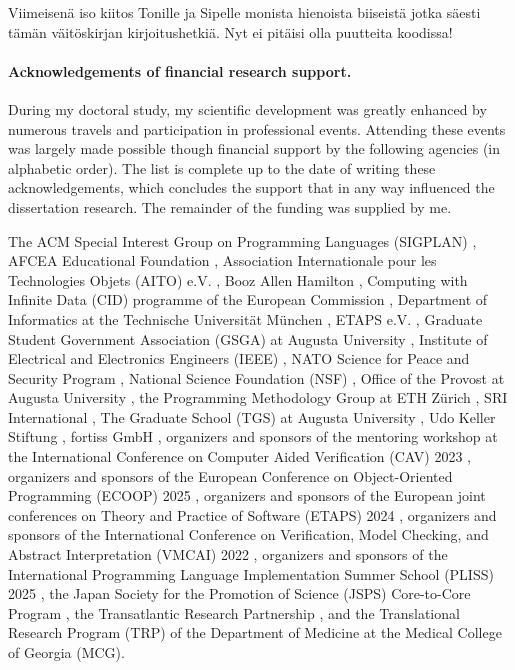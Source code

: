 Viimeisenä iso kiitos Tonille ja Sipelle monista hienoista biiseistä jotka säesti tämän väitöskirjan kirjoitushetkiä.
Nyt ei pitäisi olla puutteita koodissa!

\paragraph*{Acknowledgements of financial research support.}
During my doctoral study, my scientific development was greatly enhanced by numerous travels and participation in professional events.
Attending these events was largely made possible though financial support by the following agencies (in alphabetic order).
The list is complete up to the date of writing these acknowledgements, which concludes the support that in any way influenced the dissertation research.
The remainder of the funding was supplied by me.

The ACM Special Interest Group on Programming Languages (SIGPLAN)%
, AFCEA Educational Foundation%
, Association Internationale pour les Technologies Objets (AITO) e.V.%
, Booz Allen Hamilton%
, Computing with Infinite Data (CID) programme of the European Commission%
, Department of Informatics at the Technische Universität München%
, ETAPS e.V.%
, Graduate Student Government Association (GSGA) at Augusta University%
, Institute of Electrical and Electronics Engineers (IEEE)%
, NATO Science for Peace and Security Program%
, National Science Foundation (NSF)%
, Office of the Provost at Augusta University%
, the Programming Methodology Group at ETH Zürich%
, SRI International%
, The Graduate School (TGS) at Augusta University%
, Udo Keller Stiftung%
, fortiss GmbH%
, organizers and sponsors of the mentoring workshop at the International Conference on Computer Aided Verification (CAV) 2023%
, organizers and sponsors of the European Conference on Object-Oriented Programming (ECOOP) 2025%
, organizers and sponsors of the European joint conferences on Theory and Practice of Software (ETAPS) 2024%
, organizers and sponsors of the International Conference on Verification, Model Checking, and Abstract Interpretation (VMCAI) 2022%
, organizers and sponsors of the International Programming Language Implementation Summer School (PLISS) 2025%
, the Japan Society for the Promotion of Science (JSPS) Core-to-Core Program%
, the Transatlantic Research Partnership%
, and the Translational Research Program (TRP) of the Department of Medicine at the Medical College of Georgia (MCG).